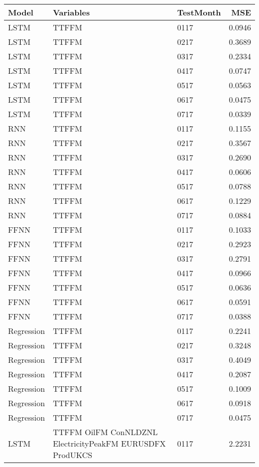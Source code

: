 \begin{table}[h!]
\centering
 \begin{adjustbox}{max width=\textwidth}
\begin{tabular}{lllr}
  \hline
Model & Variables & TestMonth & MSE \\ 
  \hline
LSTM & TTFFM  & 0117 & 0.0946 \\ 
  LSTM & TTFFM  & 0217 & 0.3689 \\ 
  LSTM & TTFFM  & 0317 & 0.2334 \\ 
  LSTM & TTFFM  & 0417 & 0.0747 \\ 
  LSTM & TTFFM  & 0517 & 0.0563 \\ 
  LSTM & TTFFM  & 0617 & 0.0475 \\ 
  LSTM & TTFFM  & 0717 & 0.0339 \\ 
  RNN & TTFFM  & 0117 & 0.1155 \\ 
  RNN & TTFFM  & 0217 & 0.3567 \\ 
  RNN & TTFFM  & 0317 & 0.2690 \\ 
  RNN & TTFFM  & 0417 & 0.0606 \\ 
  RNN & TTFFM  & 0517 & 0.0788 \\ 
  RNN & TTFFM  & 0617 & 0.1229 \\ 
  RNN & TTFFM  & 0717 & 0.0884 \\ 
  FFNN & TTFFM  & 0117 & 0.1033 \\ 
  FFNN & TTFFM  & 0217 & 0.2923 \\ 
  FFNN & TTFFM  & 0317 & 0.2791 \\ 
  FFNN & TTFFM  & 0417 & 0.0966 \\ 
  FFNN & TTFFM  & 0517 & 0.0636 \\ 
  FFNN & TTFFM  & 0617 & 0.0591 \\ 
  FFNN & TTFFM  & 0717 & 0.0388 \\ 
  Regression & TTFFM  & 0117 & 0.2241 \\ 
  Regression & TTFFM  & 0217 & 0.3248 \\ 
  Regression & TTFFM  & 0317 & 0.4049 \\ 
  Regression & TTFFM  & 0417 & 0.2087 \\ 
  Regression & TTFFM  & 0517 & 0.1009 \\ 
  Regression & TTFFM  & 0617 & 0.0918 \\ 
  Regression & TTFFM  & 0717 & 0.0475 \\ 
  LSTM & TTFFM OilFM ConNLDZNL ElectricityPeakFM EURUSDFX ProdUKCS & 0117 & 2.2231 \\ 

\end{tabular}
\end{adjustbox}
\end{table}
